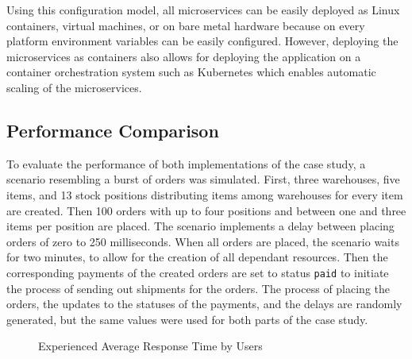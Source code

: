 Using this configuration model, all microservices can be easily deployed as Linux containers, virtual machines, or on bare metal hardware because on every platform environment variables can be easily configured.
However, deploying the microservices as containers also allows for deploying the application on a container orchestration system such as Kubernetes which enables automatic scaling of the microservices.

\subsection{Performance Comparison}\label{sec:cs-perf}

To evaluate the performance of both implementations of the case study, a scenario resembling a burst of orders was simulated.
First, three warehouses, five items, and 13 stock positions distributing items among warehouses for every item are created.
Then 100 orders with up to four positions and between one and three items per position are placed.
The scenario implements a delay between placing orders of zero to 250 milliseconds.
When all orders are placed, the scenario waits for two minutes, to allow for the creation of all dependant resources.
Then the corresponding payments of the created orders are set to status \texttt{paid} to initiate the process of sending out shipments for the orders.
The process of placing the orders, the updates to the statuses of the payments, and the delays are randomly generated, but the same values were used for both parts of the case study.

\begin{figure}[b!]
    \centering
    \caption{Experienced Average Response Time by Users}\label{fig:exp-resp-time}    
\end{figure}

